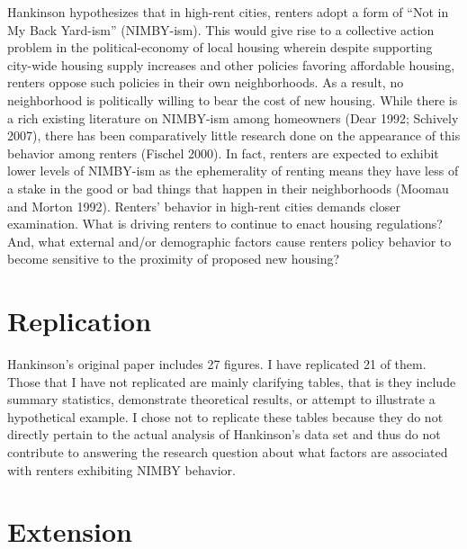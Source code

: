 \documentclass[]{article}
\begin{document}
Hankinson hypothesizes that in high-rent cities, renters adopt a form of ``Not in My Back Yard-ism'' (NIMBY-ism). This would give rise to a collective action problem in the political-economy of local housing wherein despite supporting city-wide housing supply increases and other policies favoring affordable housing, renters oppose such policies in their own neighborhoods. As a result, no neighborhood is politically willing to bear the cost of new housing. While there is a rich existing literature on NIMBY-ism among homeowners (Dear 1992; Schively 2007), there has been comparatively little research done on the appearance of this behavior among renters (Fischel 2000). In fact, renters are expected to exhibit lower levels of NIMBY-ism as the ephemerality of renting means they have less of a stake in the good or bad things that happen in their neighborhoods (Moomau and Morton 1992). Renters' behavior in high-rent cities demands closer examination. What is driving renters to continue to enact housing regulations? And, what external and/or demographic factors cause renters policy behavior to become sensitive to the proximity of proposed new housing?

\hypertarget{replication}{%
\section{Replication}\label{replication}}

Hankinson's original paper includes 27 figures. I have replicated 21 of them. Those that I have not replicated are mainly clarifying tables, that is they include summary statistics, demonstrate theoretical results, or attempt to illustrate a hypothetical example. I chose not to replicate these tables because they do not directly pertain to the actual analysis of Hankinson's data set and thus do not contribute to answering the research question about what factors are associated with renters exhibiting NIMBY behavior.

\hypertarget{extension}{%
\section{Extension}\label{extension}}
\end{document}
